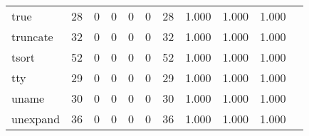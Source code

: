 \begin{longtable}{lp{1.2cm}p{1.2cm}p{1.2cm}p{1.2cm}p{1.2cm}p{1.2cm}p{1.2cm}p{1.2cm}p{1.2cm}p{1.2cm}}
true      &                                    28 &                                                  0 &                                                  0 &                                                  0 &                                                  0 &                                                 28 &                                         1.000 &                                              1.000 &                                              1.000 \\
truncate  &                                    32 &                                                  0 &                                                  0 &                                                  0 &                                                  0 &                                                 32 &                                         1.000 &                                              1.000 &                                              1.000 \\
tsort     &                                    52 &                                                  0 &                                                  0 &                                                  0 &                                                  0 &                                                 52 &                                         1.000 &                                              1.000 &                                              1.000 \\
tty       &                                    29 &                                                  0 &                                                  0 &                                                  0 &                                                  0 &                                                 29 &                                         1.000 &                                              1.000 &                                              1.000 \\
uname     &                                    30 &                                                  0 &                                                  0 &                                                  0 &                                                  0 &                                                 30 &                                         1.000 &                                              1.000 &                                              1.000 \\
unexpand  &                                    36 &                                                  0 &                                                  0 &                                                  0 &                                                  0 &                                                 36 &                                         1.000 &                                              1.000 &                                              1.000 \\

\end{longtable}
